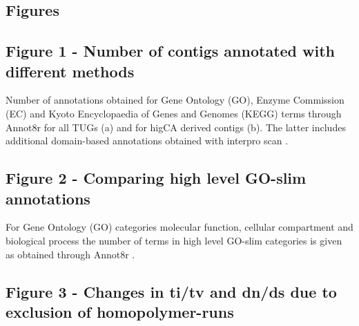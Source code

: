 \documentclass[10pt]{bmc_article}
\newenvironment{bmcformat}{\begin{raggedright}\baselineskip20pt\sloppy\setboolean{publ}{false}}{\end{raggedright}\baselineskip20pt\sloppy}
\begin{document}
\begin{bmcformat}
{
  
} %



\newpage


\section*{Figures}

\subsection*{Figure 1 - Number of contigs annotated with different
  methods}
 
Number of annotations obtained for Gene Ontology (GO), Enzyme
Commission (EC) and Kyoto Encyclopaedia of Genes and Genomes (KEGG)
terms through Annot8r\cite{schmid_annot8r:_2008} for all TUGs (a) and
for higCA derived contigs (b). The latter includes additional
domain-based annotations obtained with interpro scan
\cite{pmid11590104}.


\subsection*{Figure 2 - Comparing high level GO-slim annotations}

For Gene Ontology (GO) categories molecular function, cellular
compartment and biological process the number of terms in high level
GO-slim categories is given as obtained through Annot8r
\cite{schmid_annot8r:_2008}. 

\subsection*{Figure 3 - Changes in ti/tv and dn/ds due to exclusion of
  homopolymer-runs}


\end{bmcformat}
\end{document}

